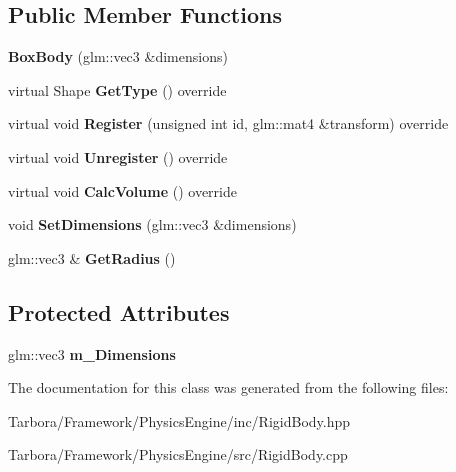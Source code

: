 \subsection*{Public Member Functions}
\begin{DoxyCompactItemize}
\item 
\mbox{\label{classTarbora_1_1BoxBody_a4588faa74c221c9f484432bc3b7a0674}} 
{\bfseries Box\+Body} (glm\+::vec3 \&dimensions)
\item 
\mbox{\label{classTarbora_1_1BoxBody_a5358c8bed677baabbba31f136d3df05d}} 
virtual Shape {\bfseries Get\+Type} () override
\item 
\mbox{\label{classTarbora_1_1BoxBody_a9030e38449087fdf091d9daea5e6efbe}} 
virtual void {\bfseries Register} (unsigned int id, glm\+::mat4 \&transform) override
\item 
\mbox{\label{classTarbora_1_1BoxBody_a57a94943897a3b90f774935bef82c47c}} 
virtual void {\bfseries Unregister} () override
\item 
\mbox{\label{classTarbora_1_1BoxBody_ab5632e04e516e518297a4826c6dd27cb}} 
virtual void {\bfseries Calc\+Volume} () override
\item 
\mbox{\label{classTarbora_1_1BoxBody_ae4b822b4acb781e9fdec907e8a92b27b}} 
void {\bfseries Set\+Dimensions} (glm\+::vec3 \&dimensions)
\item 
\mbox{\label{classTarbora_1_1BoxBody_afb67f2281aea7590c2ec72a379c954f0}} 
glm\+::vec3 \& {\bfseries Get\+Radius} ()
\end{DoxyCompactItemize}
\subsection*{Protected Attributes}
\begin{DoxyCompactItemize}
\item 
\mbox{\label{classTarbora_1_1BoxBody_aa027039b221f15f71cf01743d7fb739c}} 
glm\+::vec3 {\bfseries m\+\_\+\+Dimensions}
\end{DoxyCompactItemize}


The documentation for this class was generated from the following files\+:\begin{DoxyCompactItemize}
\item 
Tarbora/\+Framework/\+Physics\+Engine/inc/Rigid\+Body.\+hpp\item 
Tarbora/\+Framework/\+Physics\+Engine/src/Rigid\+Body.\+cpp\end{DoxyCompactItemize}
